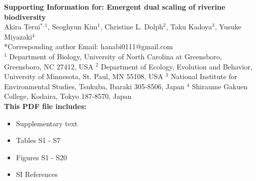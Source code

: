 \begin{flushleft}
\LARGE{\textbf{Supporting Information for: \newline Emergent dual scaling of riverine biodiversity}}\\
\vspace*{\baselineskip}
\large{Akira Terui$^{*,1}$, Seoghyun Kim$^1$, Christine L. Dolph$^2$, Taku Kadoya$^3$, Yusuke Miyazaki$^4$}\\
\vspace*{1\baselineskip}
\normalsize{*Corresponding author \newline Email: hanabi0111@gmail.com}\\
\vspace*{1\baselineskip}
\normalsize{
$^1$ Department of Biology, University of North Carolina at Greensboro, Greensboro, NC 27412, USA \newline
$^2$ Department of Ecology, Evolution and Behavior, University of Minnesota, St. Paul, MN 55108, USA \newline
$^3$ National Institute for Environmental Studies, Tsukuba, Ibaraki 305-8506, Japan \newline
$^4$ Shiraume Gakuen College, Kodaira, Tokyo 187-8570, Japan}\\
\vspace*{2\baselineskip}
\textbf{This PDF file includes:}
\begin{itemize}
\item Supplementary text
\item Tables S1 - S7
\item Figures S1 - S20
\item SI References
\end{itemize}
\end{flushleft}

\newpage